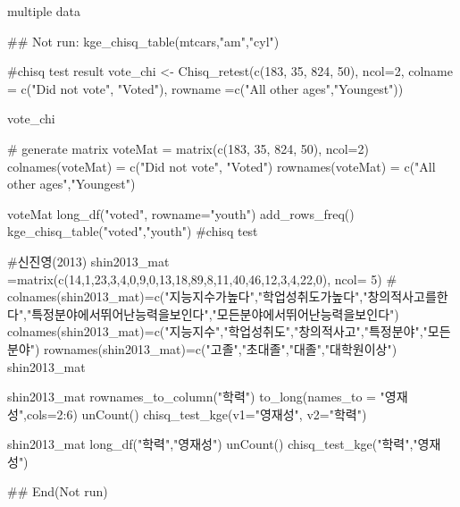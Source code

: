 \documentclass[a4paper]{book}
\begin{document}
%
\begin{Value}
multiple data
\end{Value}
%
\begin{Examples}
\begin{ExampleCode}

\#\# Not run: 
kge_chisq_table(mtcars,"am","cyl")


#chisq test result
vote_chi <- Chisq_retest(c(183, 35, 824, 50), ncol=2,
                        colname = c("Did not vote", "Voted"),
                         rowname =c("All other ages","Youngest"))

vote_chi


# generate matrix
voteMat = matrix(c(183, 35, 824, 50), ncol=2)
colnames(voteMat) = c("Did not vote", "Voted")
rownames(voteMat) = c("All other ages","Youngest")

voteMat%
  long_df("voted", rowname="youth")%
  add_rows_freq() %
  kge_chisq_table("voted","youth")    #chisq test


#신진영(2013)
shin2013_mat =matrix(c(14,1,23,3,4,0,9,0,13,18,89,8,11,40,46,12,3,4,22,0), ncol= 5)
# colnames(shin2013_mat)=c("지능지수가높다","학업성취도가높다","창의적사고를한다","특정분야에서뛰어난능력을보인다","모든분야에서뛰어난능력을보인다")
colnames(shin2013_mat)=c("지능지수","학업성취도","창의적사고","특정분야","모든분야")
rownames(shin2013_mat)=c("고졸","초대졸","대졸","대학원이상")
shin2013_mat

shin2013_mat %
  rownames_to_column("학력") %
  to_long(names_to = "영재성",cols=2:6) %
  unCount() %
  chisq_test_kge(v1="영재성", v2="학력")


shin2013_mat%
  long_df("학력","영재성") %
  unCount() %
  chisq_test_kge("학력","영재성")


## End(Not run)
\end{ExampleCode}
\end{Examples}
\end{document}
